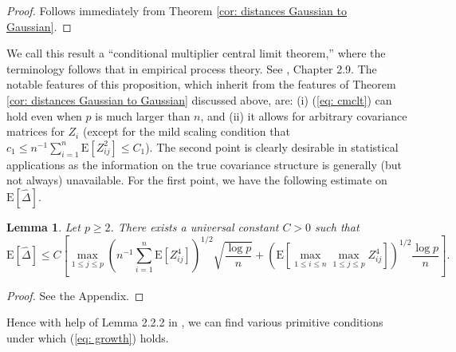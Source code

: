 \documentclass[11pt,reqno]{amsart}
\newtheorem{lemma}{Lemma}
\theoremstyle{definition}
\renewcommand{\hat}{\widehat}
\newcommand{\Ep}{{\mathrm{E}}}
\renewcommand{\Pr}{{\mathrm{P}}}
\newcommand{\RR}{\mathbb{R}}
\begin{document}
\begin{proof}
Follows immediately from Theorem \ref{cor: distances Gaussian to Gaussian}.
\end{proof}

We call this result a ``conditional multiplier central limit theorem,'' where the terminology follows that in  empirical process theory. See \cite{VW96}, Chapter 2.9.
The notable features of this proposition, which inherit from the features of Theorem \ref{cor: distances Gaussian to Gaussian} discussed above, are:  (i) (\ref{eq: cmclt}) can hold even when $p$ is much larger than $n$, and (ii) it allows for arbitrary covariance matrices for $Z_{i}$ (except for the mild scaling condition that $c_{1} \leq n^{-1} \sum_{i=1}^{n} \Ep [ Z_{ij}^{2} ] \leq C_{1}$). The second point is clearly desirable in statistical applications as the information on the true covariance structure is generally (but not always) unavailable.
For the first point, we have the following estimate on $\Ep [ \hat{\Delta} ]$.

\begin{lemma}
\label{lem: Delta estimate}
Let $p \geq 2$. There exists a universal constant $C > 0$ such that
\begin{equation*}
\Ep [ \hat{\Delta} ] \leq C \left [ \max_{1 \leq j \leq p} (n^{-1} {\textstyle \sum}_{i=1}^{n} \Ep [ Z_{ij}^{4} ])^{1/2} \sqrt{\frac{ \log p}{n}}  + ( \Ep [ \max_{1 \leq i \leq n} \max_{1 \leq j \leq p} Z_{ij}^{4} ] )^{1/2}\frac{\log p}{n} \right] .
\end{equation*}
\end{lemma}
\begin{proof}
See the Appendix.
\end{proof}
Hence with help of Lemma 2.2.2 in \cite{VW96}, we can find various primitive conditions under which (\ref{eq: growth}) holds.
\end{document}
